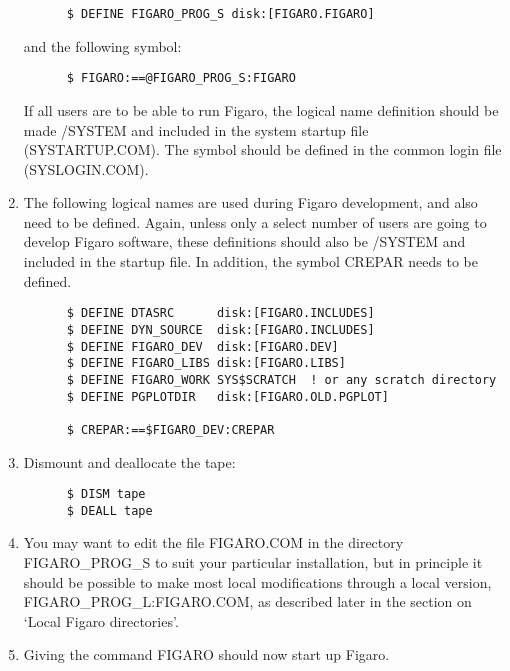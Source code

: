 \begin{enumerate}
\begin{verbatim}
      $ DEFINE FIGARO_PROG_S disk:[FIGARO.FIGARO]
\end{verbatim}

and the following symbol:

\begin{verbatim}
      $ FIGARO:==@FIGARO_PROG_S:FIGARO
\end{verbatim}
     
If all users are to be able to run Figaro, the  logical  name definition 
should be made /SYSTEM and included in the system startup file (SYSTARTUP.COM). 
The symbol should  be  defined in the common login file (SYSLOGIN.COM).

\item The  following  logical  names are used during Figaro development, and
also need to be defined.  Again, unless only a  select  number  of  users  are 
going  to  develop  Figaro software,  these  definitions  should  also  be 
/SYSTEM  and included in the startup file.  In addition, the symbol CREPAR
needs to be defined.

\begin{verbatim}
      $ DEFINE DTASRC      disk:[FIGARO.INCLUDES]
      $ DEFINE DYN_SOURCE  disk:[FIGARO.INCLUDES]
      $ DEFINE FIGARO_DEV  disk:[FIGARO.DEV]
      $ DEFINE FIGARO_LIBS disk:[FIGARO.LIBS]
      $ DEFINE FIGARO_WORK SYS$SCRATCH  ! or any scratch directory
      $ DEFINE PGPLOTDIR   disk:[FIGARO.OLD.PGPLOT]
    
      $ CREPAR:==$FIGARO_DEV:CREPAR
\end{verbatim}

\item Dismount and deallocate the tape:

\begin{verbatim}
      $ DISM tape
      $ DEALL tape
\end{verbatim}

\item You may want to edit the file  FIGARO.COM  in  the  directory
FIGARO\_PROG\_S  to  suit  your particular installation, but in principle  it 
should  be  possible  to make most local modifications   through  
a   local  version, FIGARO\_PROG\_L:FIGARO.COM, as described later in 
the  section on `Local Figaro directories'.

\item Giving the command FIGARO should now start up Figaro.

\end{enumerate}

